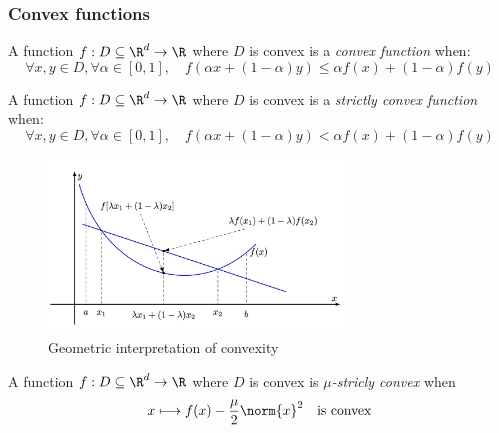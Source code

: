 \documentclass[toc, titlepaged]{../cs-classes/cs-classes}
\begin{document}
\subsubsection{Convex functions}
\begin{definition}
    A function $f:D\subseteq\R^d\to\R$ where $D$ is convex is a \emph{convex function} when:
    \begin{equation}
        \forall x, y \in D, \forall \alpha\in[0, 1], \quad f(\alpha x+(1-\alpha)y)\leq\alpha f(x) + (1-\alpha)f(y)
    \end{equation}
\end{definition}

\begin{definition}
    A function $f:D\subseteq\R^d\to\R$ where $D$ is convex is a \emph{strictly convex function} when:
    \begin{equation}
        \forall x, y \in D, \forall \alpha\in[0, 1], \quad f(\alpha x+(1-\alpha)y)<\alpha f(x) + (1-\alpha)f(y)
    \end{equation}
\end{definition}

\vspace*{-0.5cm}
\begin{figure}[H]
    \centering
    \captionsetup{justification=centering}
    \includegraphics[width=0.7\textwidth]{images/convexity.jpg}
    \caption{Geometric interpretation of convexity}
\end{figure}

\begin{definition}
    A function $f:D\subseteq\R^d\to\R$ where $D$ is convex is \emph{$\mu$-stricly convex} when 
    \begin{equation*}
        x\longmapsto f(x)-\frac{\mu}{2}\norm{x}^2 \quad\textnormal{is convex}
    \end{equation*}
\end{definition}
\end{document}
